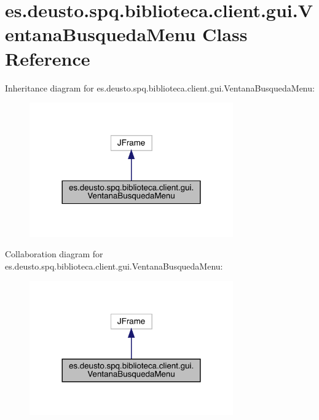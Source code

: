 \hypertarget{classes_1_1deusto_1_1spq_1_1biblioteca_1_1client_1_1gui_1_1_ventana_busqueda_menu}{}\section{es.\+deusto.\+spq.\+biblioteca.\+client.\+gui.\+Ventana\+Busqueda\+Menu Class Reference}
\label{classes_1_1deusto_1_1spq_1_1biblioteca_1_1client_1_1gui_1_1_ventana_busqueda_menu}


Inheritance diagram for es.\+deusto.\+spq.\+biblioteca.\+client.\+gui.\+Ventana\+Busqueda\+Menu\+:
\nopagebreak
\begin{figure}[H]
\begin{center}
\leavevmode
\includegraphics[width=248pt]{classes_1_1deusto_1_1spq_1_1biblioteca_1_1client_1_1gui_1_1_ventana_busqueda_menu__inherit__graph}
\end{center}
\end{figure}


Collaboration diagram for es.\+deusto.\+spq.\+biblioteca.\+client.\+gui.\+Ventana\+Busqueda\+Menu\+:
\nopagebreak
\begin{figure}[H]
\begin{center}
\leavevmode
\includegraphics[width=248pt]{classes_1_1deusto_1_1spq_1_1biblioteca_1_1client_1_1gui_1_1_ventana_busqueda_menu__coll__graph}
\end{center}
\end{figure}
